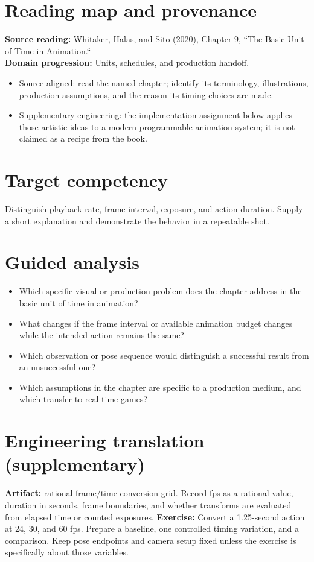 \documentclass[10pt,letterpaper]{article}
\begin{document}
\makedoctitle
\makedocsummary

\section{Reading map and provenance}
\textbf{Source reading:} Whitaker, Halas, and Sito (2020), Chapter 9, ``The Basic Unit of Time in Animation.``\\
\textbf{Domain progression:} Units, schedules, and production handoff.
\begin{itemize}
\item Source-aligned: read the named chapter; identify its terminology, illustrations, production assumptions, and the reason its timing choices are made.
\item Supplementary engineering: the implementation assignment below applies those artistic ideas to a modern programmable animation system; it is not claimed as a recipe from the book.
\end{itemize}
\section{Target competency}
Distinguish playback rate, frame interval, exposure, and action duration. Supply a short explanation and demonstrate the behavior in a repeatable shot.
\section{Guided analysis}
\begin{itemize}
\item Which specific visual or production problem does the chapter address in the basic unit of time in animation?
\item What changes if the frame interval or available animation budget changes while the intended action remains the same?
\item Which observation or pose sequence would distinguish a successful result from an unsuccessful one?
\item Which assumptions in the chapter are specific to a production medium, and which transfer to real-time games?
\end{itemize}
\section{Engineering translation (supplementary)}
\textbf{Artifact:} rational frame/time conversion grid. Record fps as a rational value, duration in seconds, frame boundaries, and whether transforms are evaluated from elapsed time or counted exposures.
\textbf{Exercise:} Convert a 1.25-second action at 24, 30, and 60 fps. Prepare a baseline, one controlled timing variation, and a comparison. Keep pose endpoints and camera setup fixed unless the exercise is specifically about those variables.
\end{document}
